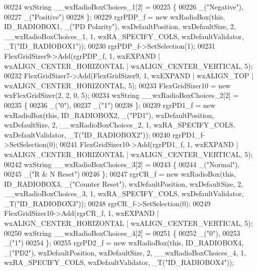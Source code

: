 \begin{DoxyCode}
00224     wxString \_\_wxRadioBoxChoices\_1[2] =
00225     \{
00226         \_(\textcolor{stringliteral}{"Negative"}),
00227         \_(\textcolor{stringliteral}{"Positive"})
00228     \};
00229     rgrPDP\_f = \textcolor{keyword}{new} wxRadioBox(\textcolor{keyword}{this}, ID\_RADIOBOX1, \_(\textcolor{stringliteral}{"PD Polarity"}), wxDefaultPosition, wxDefaultSize, 2, 
      \_\_wxRadioBoxChoices\_1, 1, wxRA\_SPECIFY\_COLS, wxDefaultValidator, \_T(\textcolor{stringliteral}{"ID\_RADIOBOX1"}));
00230     rgrPDP\_f->SetSelection(1);
00231     FlexGridSizer9->Add(rgrPDP\_f, 1, wxEXPAND | wxALIGN\_CENTER\_HORIZONTAL | wxALIGN\_CENTER\_VERTICAL, 5);
00232     FlexGridSizer7->Add(FlexGridSizer9, 1, wxEXPAND | wxALIGN\_TOP | wxALIGN\_CENTER\_HORIZONTAL, 5);
00233     FlexGridSizer10 = \textcolor{keyword}{new} wxFlexGridSizer(2, 2, 0, 5);
00234     wxString \_\_wxRadioBoxChoices\_2[2] =
00235     \{
00236         \_(\textcolor{stringliteral}{"0"}),
00237         \_(\textcolor{stringliteral}{"1"})
00238     \};
00239     rgrPD1\_f = \textcolor{keyword}{new} wxRadioBox(\textcolor{keyword}{this}, ID\_RADIOBOX2, \_(\textcolor{stringliteral}{"PD1"}), wxDefaultPosition, wxDefaultSize, 2, 
      \_\_wxRadioBoxChoices\_2, 1, wxRA\_SPECIFY\_COLS, wxDefaultValidator, \_T(\textcolor{stringliteral}{"ID\_RADIOBOX2"}));
00240     rgrPD1\_f->SetSelection(0);
00241     FlexGridSizer10->Add(rgrPD1\_f, 1, wxEXPAND | wxALIGN\_CENTER\_HORIZONTAL | wxALIGN\_CENTER\_VERTICAL, 5);
00242     wxString \_\_wxRadioBoxChoices\_3[2] =
00243     \{
00244         \_(\textcolor{stringliteral}{"Normal"}),
00245         \_(\textcolor{stringliteral}{"R & N Reset"})
00246     \};
00247     rgrCR\_f = \textcolor{keyword}{new} wxRadioBox(\textcolor{keyword}{this}, ID\_RADIOBOX3, \_(\textcolor{stringliteral}{"Counter Reset"}), wxDefaultPosition, wxDefaultSize, 2, 
      \_\_wxRadioBoxChoices\_3, 1, wxRA\_SPECIFY\_COLS, wxDefaultValidator, \_T(\textcolor{stringliteral}{"ID\_RADIOBOX3"}));
00248     rgrCR\_f->SetSelection(0);
00249     FlexGridSizer10->Add(rgrCR\_f, 1, wxEXPAND | wxALIGN\_CENTER\_HORIZONTAL | wxALIGN\_CENTER\_VERTICAL, 5);
00250     wxString \_\_wxRadioBoxChoices\_4[2] =
00251     \{
00252         \_(\textcolor{stringliteral}{"0"}),
00253         \_(\textcolor{stringliteral}{"1"})
00254     \};
00255     rgrPD2\_f = \textcolor{keyword}{new} wxRadioBox(\textcolor{keyword}{this}, ID\_RADIOBOX4, \_(\textcolor{stringliteral}{"PD2"}), wxDefaultPosition, wxDefaultSize, 2, 
      \_\_wxRadioBoxChoices\_4, 1, wxRA\_SPECIFY\_COLS, wxDefaultValidator, \_T(\textcolor{stringliteral}{"ID\_RADIOBOX4"}));

\end{DoxyCode}

